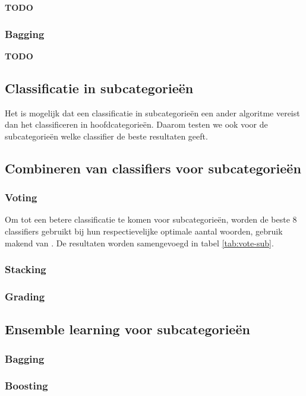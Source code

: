 \textbf{TODO}

\subsubsection{Bagging}
\textbf{TODO}
 

\subsection{Classificatie in subcategorie\"en}
Het is mogelijk dat een classificatie in subcategorie\"en een ander algoritme vereist dan het classificeren in hoofdcategorie\"en. Daarom testen we ook voor de subcategorie\"en welke classifier de beste resultaten geeft. 


\subsection{Combineren van classifiers voor subcategorie\"en}
\subsubsection{Voting}
Om tot een betere classificatie te komen voor subcategorie\"en, worden de beste 8 classifiers gebruikt bij hun respectievelijke optimale aantal woorden, gebruik makend van . De resultaten worden samengevoegd in tabel \ref{tab:vote-sub}.



\subsubsection{Stacking}
\subsubsection{Grading}
\subsection{Ensemble learning voor subcategorie\"en}
\subsubsection{Bagging}
\subsubsection{Boosting}


